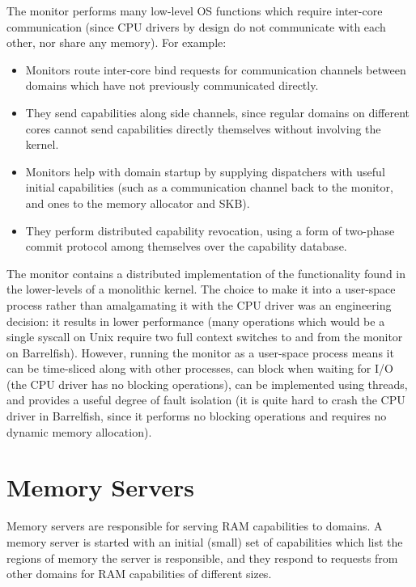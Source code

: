 \documentclass[a4paper,twoside]{report} %
\begin{document}
The monitor performs many low-level OS functions which require
inter-core communication (since CPU drivers by design do not
communicate with each other, nor share any memory).  For example: 

\begin{itemize}
\item Monitors route inter-core bind requests for communication
  channels between domains which have not previously communicated
  directly. 
\item They send capabilities along side channels, since regular
  domains on different cores cannot send capabilities directly
  themselves without involving the kernel. 
\item Monitors help with domain startup by supplying dispatchers with
  useful initial capabilities (such as a communication channel back
  to the monitor, and ones to the memory allocator and SKB). 
\item They perform distributed capability revocation, using a form of
  two-phase commit protocol among themselves over the capability
  database. 
\end{itemize}

The monitor contains a distributed implementation of the functionality
found in the lower-levels of a monolithic kernel.  The choice to make
it into a user-space process rather than amalgamating it with the CPU
driver was an engineering decision: it results in lower performance
(many operations which would be a single syscall on Unix require two
full context switches to and from the monitor on Barrelfish).
However, running the monitor as a user-space process means it can be
time-sliced along with other processes, can block when waiting for I/O
(the CPU driver has no blocking operations), can be implemented using
threads, and provides a useful degree of fault isolation (it is quite
hard to crash the CPU driver in Barrelfish, since it performs no
blocking operations and requires no dynamic memory allocation).

\section{Memory Servers}

Memory servers are responsible for serving RAM capabilities to
domains.  A memory server is started with an initial (small) set of
capabilities which list the regions of memory the server is
responsible, and they respond to requests from other domains for RAM
capabilities of different sizes. 
\end{document}
